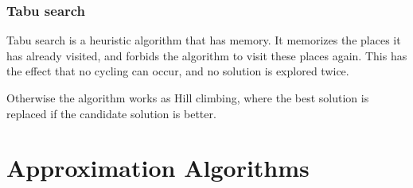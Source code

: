 \documentclass[10pt]{article}
\begin{document}
\subsubsection{Tabu search} %
\label{ssub:tabu_search}
Tabu search is a heuristic algorithm that has memory. It memorizes the places it has already visited, and forbids the algorithm to visit these places again. This has the effect that no cycling can occur, and no solution is explored twice. 

Otherwise the algorithm works as Hill climbing, where the best solution is replaced if the candidate solution is better.


\clearpage \newpage
\section{Approximation Algorithms} %
\label{sec:approximation_algorithms}
\end{document}
